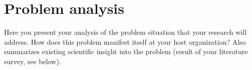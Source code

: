 \chapter{Problem analysis}
Here you present your analysis of the problem situation that your research will address. How does this problem manifest itself at your host organization? Also summarizes existing scientific insight into the problem (result of your literature survey, see below).

\lipsum[5]

